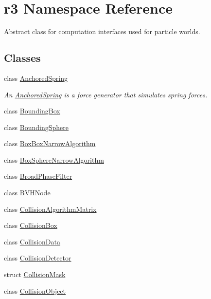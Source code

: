 \hypertarget{namespacer3}{}\section{r3 Namespace Reference}
\label{namespacer3}


Abstract class for computation interfaces used for particle worlds.  


\subsection*{Classes}
\begin{DoxyCompactItemize}
\item 
class \mbox{\hyperlink{classr3_1_1_anchored_spring}{Anchored\+Spring}}
\begin{DoxyCompactList}\small\item\em An \mbox{\hyperlink{classr3_1_1_anchored_spring}{Anchored\+Spring}} is a force generator that simulates spring forces. \end{DoxyCompactList}\item 
class \mbox{\hyperlink{classr3_1_1_bounding_box}{Bounding\+Box}}
\item 
class \mbox{\hyperlink{classr3_1_1_bounding_sphere}{Bounding\+Sphere}}
\item 
class \mbox{\hyperlink{classr3_1_1_box_box_narrow_algorithm}{Box\+Box\+Narrow\+Algorithm}}
\item 
class \mbox{\hyperlink{classr3_1_1_box_sphere_narrow_algorithm}{Box\+Sphere\+Narrow\+Algorithm}}
\item 
class \mbox{\hyperlink{classr3_1_1_broad_phase_filter}{Broad\+Phase\+Filter}}
\item 
class \mbox{\hyperlink{classr3_1_1_b_v_h_node}{B\+V\+H\+Node}}
\item 
class \mbox{\hyperlink{classr3_1_1_collision_algorithm_matrix}{Collision\+Algorithm\+Matrix}}
\item 
class \mbox{\hyperlink{classr3_1_1_collision_box}{Collision\+Box}}
\item 
class \mbox{\hyperlink{classr3_1_1_collision_data}{Collision\+Data}}
\item 
class \mbox{\hyperlink{classr3_1_1_collision_detector}{Collision\+Detector}}
\item 
struct \mbox{\hyperlink{structr3_1_1_collision_mask}{Collision\+Mask}}
\item 
class \mbox{\hyperlink{classr3_1_1_collision_object}{Collision\+Object}}
\item 

\end{DoxyCompactItemize}
